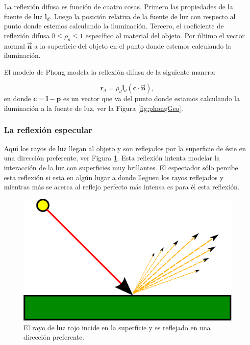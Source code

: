 La reflexión difusa es función de cuatro cosas. Primero las propiedades de la fuente de luz $\textbf{l}_d$. Luego la posición relativa de la fuente de luz con respecto al punto donde estemos calculando la iluminación. Tercero, el coeficiente de reflexión difusa $0 \leq \rho_d \leq 1$ específico al material del objeto. Por último el vector normal $\vec{\textbf{n}}$ a la superficie del objeto en el punto donde estemos calculando la iluminación.

El modelo de Phong modela la reflexión difusa de la siguiente manera:

\begin{equation}
\textbf{r}_d = \rho_d \textbf{l}_d (\textbf{c} \cdot \vec{\textbf{n}}), 
\label{ec:refDifusa}
\end{equation}
en donde $\textbf{c} = \textbf{l} - \textbf{p}$ es un vector que va del punto donde estamos calculando la iluminación a la fuente de luz, ver la Figura \ref{fig:phongGeo}.

\subsubsection{La reflexión especular}

Aquí los rayos de luz llegan al objeto y son reflejados por la superficie de éste en una dirección preferente, ver Figura \ref{fig:refEspecular}. Esta reflexión intenta modelar la interacción de la luz con superficies muy brillantes. El espectador sólo percibe esta reflexión si esta en algún lugar a donde lleguen los rayos reflejados y mientras más se acerca al reflejo perfecto más intensa es para él esta reflexión.

\begin{figure}[htp]
 \centering
  \includegraphics[scale=1.0]{img/cap01/especular}
  \caption[Reflexión especular]{El rayo de luz rojo incide en la superficie y es reflejado en una dirección preferente.}
  \label{fig:refEspecular}
\end{figure}

